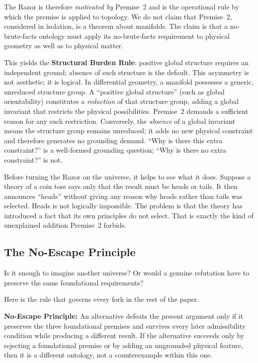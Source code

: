 \documentclass[11pt]{article}
\theoremstyle{canonstyle}
\begin{document}
The Razor is therefore \emph{motivated by} Premise~2 and is the operational rule by which the premise is applied to topology. We do not claim that Premise~2, considered in isolation, is a theorem about manifolds. The claim is that a no-brute-facts ontology must apply its no-brute-facts requirement to physical geometry as well as to physical matter.

This yields the \textbf{Structural Burden Rule}: positive global structure requires an independent ground; absence of such structure is the default. This asymmetry is not aesthetic; it is logical. In differential geometry, a manifold possesses a generic, unreduced structure group. A ``positive global structure'' (such as global orientability) constitutes a \emph{reduction} of that structure group, adding a global invariant that restricts the physical possibilities. Premise~2 demands a sufficient reason for any such restriction. Conversely, the \emph{absence} of a global invariant means the structure group remains unreduced; it adds no new physical constraint and therefore generates no grounding demand. ``Why is there this extra constraint?'' is a well-formed grounding question; ``Why is there no extra constraint?'' is not.

Before turning the Razor on the universe, it helps to see what it does. Suppose a theory of a coin toss says only that the result must be heads or tails. It then announces ``heads'' without giving any reason why heads rather than tails was selected. Heads is not logically impossible. The problem is that the theory has introduced a fact that its own principles do not select. That is exactly the kind of unexplained addition Premise~2 forbids.

\subsection{The No-Escape Principle}

\begin{reflect}
Is it enough to imagine another universe? Or would a genuine refutation have to preserve the same foundational requirements?
\end{reflect}

Here is the rule that governs every fork in the rest of the paper.

\begin{keyresult}
\textbf{No-Escape Principle:} An alternative defeats the present argument only if it preserves the three foundational premises and survives every later admissibility condition while producing a different result. If the alternative succeeds only by rejecting a foundational premise or by adding an ungrounded physical feature, then it is a different ontology, not a counterexample within this one.
\end{keyresult}
\end{document}
